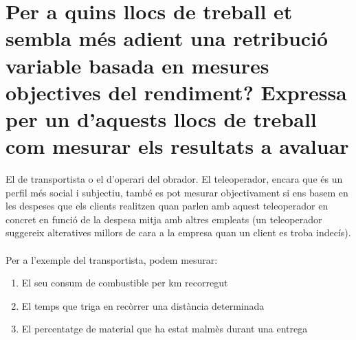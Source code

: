 \section{Per a quins llocs de treball et sembla més adient una retribució variable basada en mesures objectives del rendiment? Expressa per un d’aquests llocs de treball com mesurar els resultats a avaluar}

El de transportista o el d'operari del obrador. El teleoperador, encara que és un perfil més social i subjectiu, també es pot mesurar objectivament si ens basem en les despeses que els clients realitzen quan parlen amb aquest teleoperador en concret en funció de la despesa mitja amb altres empleats (un teleoperador suggereix alteratives millors de cara a la empresa quan un client es troba indecís).
\\ \\
Per a l'exemple del transportista, podem mesurar:

\begin{enumerate}
  \item El seu consum de combustible per km recorregut
  \item El temps que triga en recòrrer una distància determinada
  \item El percentatge de material que ha estat malmès durant una entrega
\end{enumerate}
